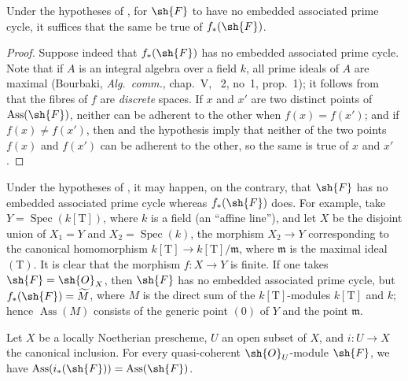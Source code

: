 \begin{corollary}[3.1.11]
\label{IV.3.1.11}
Under the hypotheses of , for $\sh{F}$ to have no embedded associated prime cycle, it suffices that the same be true of $f_*(\sh{F})$.
\end{corollary}

\begin{proof}
Suppose indeed that $f_*(\sh{F})$ has no embedded associated prime cycle.
Note that if $A$ is an integral algebra over a field $k$, all prime ideals of $A$ are maximal (Bourbaki, \emph{Alg.\ comm.}, chap.~V, \textsection~2, no~1, prop.~1); it follows from  that the fibres of $f$ are \emph{discrete} spaces. If $x$ and $x'$ are two distinct points of $\operatorname{Ass}(\sh{F})$, neither can be adherent to the other when $f(x)=f(x')$; and if $f(x)\neq f(x')$, then  and the hypothesis imply that neither of the two points $f(x)$ and $f(x')$ can be adherent to the other, so the same is true of $x$ and $x'$.
\end{proof}

\begin{remark}[3.1.12]
\label{IV.3.1.12}
Under the hypotheses of , it may happen, on the contrary, that $\sh{F}$ has no embedded associated prime cycle whereas $f_*(\sh{F})$ does.
For example, take $Y=\operatorname{Spec}(k[\mathrm{T}])$, where $k$ is a field (an ``affine line''), and let $X$ be the disjoint union of $X_1=Y$ and $X_2=\operatorname{Spec}(k)$, the morphism $X_2\to Y$ corresponding to the canonical homomorphism $k[\mathrm{T}]\to k[\mathrm{T}]/\mathfrak{m}$, where $\mathfrak{m}$ is the maximal ideal $(\mathrm{T})$.
It is clear that the morphism $f:X\to Y$ is finite. If one takes $\sh{F}=\sh{O}_X$, then $\sh{F}$ has no embedded associated prime cycle, but $f_*(\sh{F})=\widetilde{M}$, where $M$ is the direct sum of the $k[\mathrm{T}]$-modules $k[\mathrm{T}]$ and $k$; hence $\operatorname{Ass}(M)$ consists of the generic point $(0)$ of $Y$ and the point $\mathfrak{m}$.
\end{remark}

\begin{proposition}[3.1.13]
\label{IV.3.1.13}
Let $X$ be a locally Noetherian prescheme, $U$ an open subset of $X$, and $i:U\to X$ the canonical inclusion.
For every quasi-coherent $\sh{O}_U$-module $\sh{F}$, we have $\operatorname{Ass}(i_*(\sh{F}))=\operatorname{Ass}(\sh{F})$.
\end{proposition}

